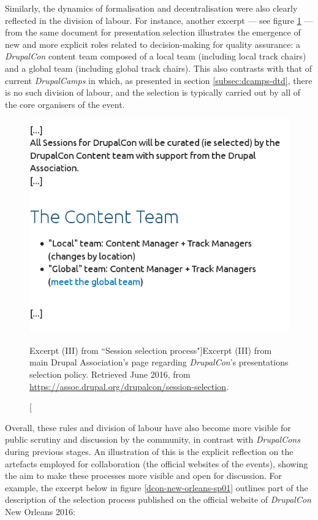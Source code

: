 Similarly, the dynamics of formalisation and decentralisation were also clearly reflected in the division of labour. For instance, another excerpt --- see figure \ref{da-dcon-selec03} --- from the same document for presentation selection illustrates the emergence of new and more explicit roles related to decision-making for quality assurance: a \textit{DrupalCon} content team composed of a local team (including local track chairs) and a global team (including global track chairs). This also contrasts with that of current \textit{DrupalCamps} in which, as presented in section \ref{subsec:dcamps-dtd}, there is no such division of labour, and the selection is typically carried out by all of the core organisers of the event.

\begin{figure}[H]
\centering
\includegraphics[scale=0.5]{img/quotes_replacement/dcon_sesssion_policy_june16_01.png}
\caption[Excerpt (III) from ``Session selection process"]{Excerpt (III) from main Drupal Association's page regarding \textit{DrupalCon}'s presentations selection policy. Retrieved  June 2016, from \url{https://assoc.drupal.org/drupalcon/session-selection}.}
\label{da-dcon-selec03}
\end{figure}

Overall, these rules and division of labour have also become more visible for public scrutiny and discussion by the community, in contrast with \textit{DrupalCons} during previous stages. An illustration of this is the explicit reflection on the artefacts employed for collaboration (the official websites of the events), showing the aim to make these processes more visible and open for discussion. For example, the excerpt below in figure \ref{dcon-new-orleans-sp01} outlines part of the description of the selection process published on the official website of \textit{DrupalCon} New Orleans 2016:

